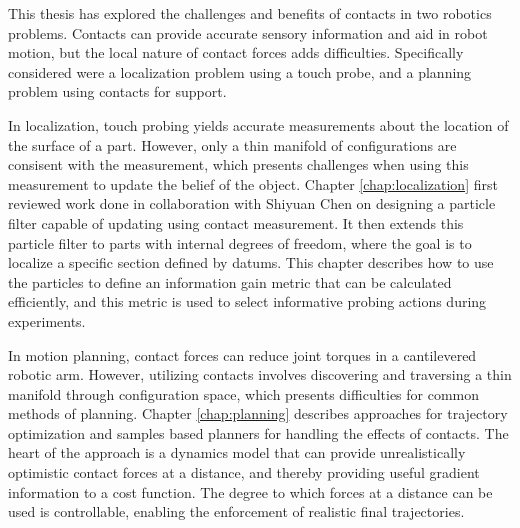 \documentclass[../thesis.tex]{subfiles}
\begin{document}

This thesis has explored the challenges and benefits of contacts in two robotics problems.
Contacts can provide accurate sensory information and aid in robot motion, but the local nature of contact forces adds difficulties.
Specifically considered were a localization problem using a touch probe, and a planning problem using contacts for support.

In localization, touch probing yields accurate measurements about the location of the surface of a part.
However, only a thin manifold of configurations are consisent with the measurement, which presents challenges when using this measurement to update the belief of the object.
Chapter \ref{chap:localization} first reviewed work done in collaboration with Shiyuan Chen \cite{Saund2017} on designing a particle filter capable of updating using contact measurement.
It then extends this particle filter to parts with internal degrees of freedom, where the goal is to localize a specific section defined by datums.
This chapter describes how to use the particles to define an information gain metric that can be calculated efficiently, and this metric is used to select informative probing actions during experiments.

In motion planning, contact forces can reduce joint torques in a cantilevered robotic arm.
However, utilizing contacts involves discovering and traversing a thin manifold through configuration space, which presents difficulties for common methods of planning.
Chapter \ref{chap:planning} describes approaches for trajectory optimization and samples based planners for handling the effects of contacts.
The heart of the approach is a dynamics model that can provide unrealistically optimistic contact forces at a distance, and thereby providing useful gradient information to a cost function.
The degree to which forces at a distance can be used is controllable, enabling the enforcement of realistic final trajectories.
\end{document}
